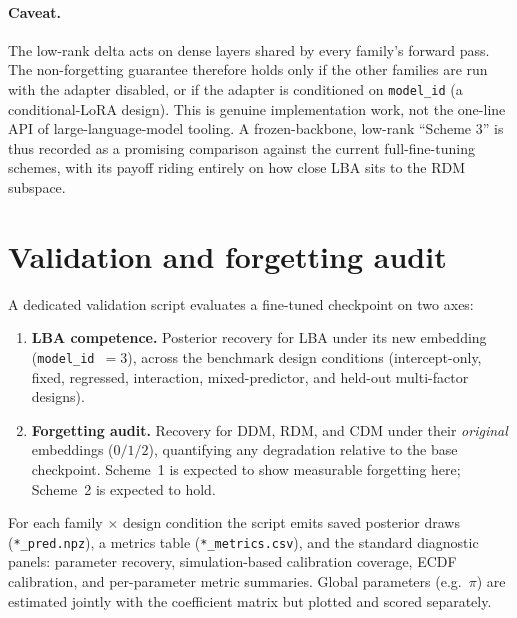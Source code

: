 \documentclass[11pt]{article}
\begin{document}
\paragraph{Caveat.}
The low-rank delta acts on dense layers shared by every family's forward pass.
The non-forgetting guarantee therefore holds only if the other families are run
with the adapter disabled, or if the adapter is conditioned on
\texttt{model\_id} (a conditional-LoRA design). This is genuine implementation
work, not the one-line API of large-language-model tooling. A frozen-backbone,
low-rank ``Scheme 3'' is thus recorded as a promising comparison against the
current full-fine-tuning schemes, with its payoff riding entirely on how close
LBA sits to the RDM subspace.

\section{Validation and forgetting audit}

A dedicated validation script evaluates a fine-tuned checkpoint on two axes:

\begin{enumerate}
  \item \textbf{LBA competence.} Posterior recovery for LBA under its new
    embedding (\texttt{model\_id}~$=3$), across the benchmark design conditions
    (intercept-only, fixed, regressed, interaction, mixed-predictor, and
    held-out multi-factor designs).
  \item \textbf{Forgetting audit.} Recovery for DDM, RDM, and CDM under their
    \emph{original} embeddings ($0/1/2$), quantifying any degradation relative
    to the base checkpoint. Scheme~1 is expected to show measurable forgetting
    here; Scheme~2 is expected to hold.
\end{enumerate}

For each family $\times$ design condition the script emits saved posterior draws
(\texttt{*\_pred.npz}), a metrics table (\texttt{*\_metrics.csv}), and the
standard diagnostic panels: parameter recovery, simulation-based calibration
coverage, ECDF calibration, and per-parameter metric summaries. Global
parameters (e.g.\ $\pi$) are estimated jointly with the coefficient matrix but
plotted and scored separately.

\end{document}
